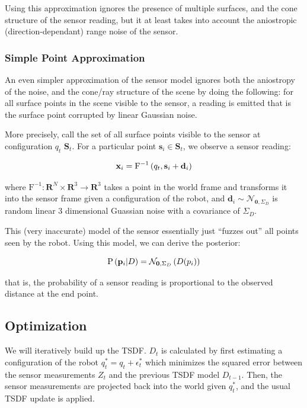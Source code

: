 \documentclass{article}
\begin{document}
Using this approximation ignores the presence of multiple surfaces, and the cone structure of the sensor reading,  but it at least takes into account the aniostropic (direction-dependant) range noise of the sensor.

\subsubsection{Simple Point Approximation}

An even simpler approximation of the sensor model ignores both the aniostropy of the noise, and the cone/ray structure of the scene by doing the following: for all surface points in the scene visible to the sensor, a reading is emitted that is the
surface point corrupted by linear Gaussian noise.

More precisely, call the set of all surface points visible to the sensor at configuration $q_t$ $\mathbf{S}_t$.  For a particular point $\mathbf{s}_i \in \mathbf{S}_t$, we observe a sensor reading:

\begin{equation}
\mathbf{x}_i = \text{F}^{-1}\left(q_t, \mathbf{s}_i +\mathbf{d}_i\right)
\end{equation}

\noindent where $\text{F}^{-1} : \mathbf{R}^N \times \mathbf{R}^3 \to \mathbf{R}^3$ takes a point in the world frame and transforms it into the sensor frame given a configuration of the robot,  and $\mathbf{d}_i \sim \mathcal{N}_{\mathbf{0},
\Sigma_D}$ is random linear 3 dimensional Guassian noise with a covariance of $\Sigma_D$.

This (very inaccurate) model of the sensor essentially just ``fuzzes out'' all points seen by the robot.  Using this model, we can derive the posterior:

\begin{equation}
\text{P} \left(\mathbf{p}_i | D \right) = \mathcal{N}_{\mathbf{0}, \Sigma_D}\left(D(p_i) \right)
\end{equation} 

\noindent that is, the probability of a sensor reading is proportional to the observed distance at the end point.

\subsection{Optimization} 

We will iteratively build up the TSDF. $D_t$ is calculated by first estimating a
configuration of the robot $q^*_t = q_t + \epsilon^*_t$ which minimizes the
squared error between the sensor measurements $Z_t$ and the previous TSDF model
$D_{t - 1}$.  Then, the sensor measurements are projected back into the world
given $q^*_t$, and the usual TSDF update is applied.
\end{document}
